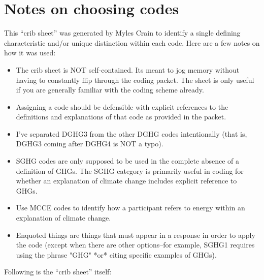 
\section{Notes on choosing codes}

This “crib sheet” was generated by Myles Crain to identify a single defining
characteristic and/or unique distinction within each code. Here are a few notes
on how it was used:

\begin{itemize}
\item The crib sheet is NOT self-contained. Its meant to jog memory
without having to constantly flip through the coding packet. The sheet
is only useful if you are generally familiar with the coding scheme
already.

\item Assigning a code should be defensible with explicit references to
the definitions and explanations of that code as provided in the
packet.

\item I've separated DGHG3 from the other DGHG codes intentionally (that
is, DGHG3 coming after DGHG4 is NOT a typo).

\item SGHG codes are only supposed to be used in the complete absence of a
definition of GHGs. The SGHG category is primarily useful in coding
for whether an explanation of climate change includes explicit
reference to GHGs.

\item Use MCCE codes to identify how a participant refers to energy within
an explanation of climate change.

\item Enquoted things are things that must appear in a response in order
to apply the code (except when there are other options--for example,
SGHG1 requires using the phrase "GHG" *or* citing specific examples of
GHGs).
\end{itemize}
Following is the “crib sheet” itself:


